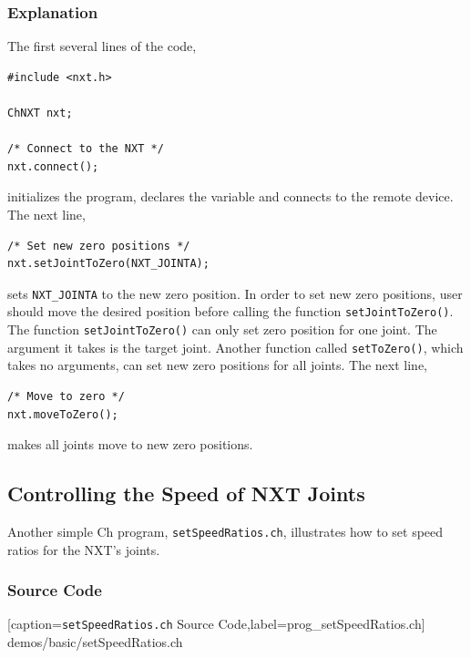 \documentclass[11pt]{article}
\begin{document}
\subsubsection*{Explanation}
The first several lines of the code,
\begin{lstlisting}
#include <nxt.h>

ChNXT nxt;

/* Connect to the NXT */
nxt.connect();
\end{lstlisting}
initializes the program, declares the variable and connects to the remote device. 
The next line,
\begin{lstlisting}
/* Set new zero positions */
nxt.setJointToZero(NXT_JOINTA);
\end{lstlisting}
sets {\tt NXT\_JOINTA} to the new zero position. In order to set new zero positions, user 
should move the desired position before calling the function {\tt setJointToZero()}. The 
function {\tt setJointToZero()} can only set zero position for one joint. The argument 
it takes is the target joint. Another function called {\tt setToZero()}, which takes no 
arguments, can set new zero positions for all joints. The next line,
\begin{lstlisting}
/* Move to zero */
nxt.moveToZero();
\end{lstlisting}
makes all joints move to new zero positions.

\subsection{\label{sec:speed_demo}Controlling the Speed of NXT Joints}
Another simple Ch program, {\tt setSpeedRatios.ch}, illustrates how to set speed
ratios for the NXT's joints.

\subsubsection*{Source Code}

    [caption={{\tt setSpeedRatios.ch} Source Code},label=prog_setSpeedRatios.ch]
    {demos/basic/setSpeedRatios.ch}
\end{document}
